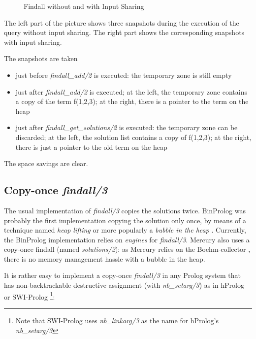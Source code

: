 \documentclass{tlp}
\begin{document}
\begin{figure}[h]
\begin{centering}
{}
\caption{Findall without and with Input Sharing}
\label{findallfig1}
\end{centering}
\end{figure}

The left part of the picture shows three snapshots during the execution
of the query without input sharing. The right part shows the
corresponding snapshots with input sharing.

The snapshots are taken 
\begin{itemize}
\item just before {\em findall\_add/2} is executed: the temporary zone is
  still empty
\item just after {\em findall\_add/2} is executed; at the left, the temporary
zone contains a copy of the term f(1,2,3); at the right, there is a
pointer to the term on the heap
\item just after {\em findall\_get\_solutions/2} is executed: the temporary
  zone can be discarded; at the left, the solution list contains a
copy of f(1,2,3); at the right, there is just a pointer to the old
term on the heap
\end{itemize}

The space savings are clear.


\subsection{Copy-once {\em findall/3}}

The usual implementation of {\em findall/3} copies the solutions twice.
BinProlog was probably the first implementation copying the solution
only once, by means of a technique named {\em heap lifting} or more
popularly a {\em bubble in the heap}
\cite{ecologicalPaul@IWMM-92}. Currently, the BinProlog
implementation \cite{padl09inter} relies on {\em engines} for
{\em findall/3}. Mercury also uses a copy-once findall (named {\em solutions/2}):
as Mercury relies on the Boehm-collector \cite{hansboehm}, there is no memory
management hassle with a bubble in the heap.

It is rather easy to implement a copy-once {\em findall/3} in any
Prolog system that has non-backtrackable destructive assignment (with
{\em nb\_setarg/3}) as in hProlog or SWI-Prolog
\cite{swiprolog}\footnote{Note that SWI-Prolog uses {\em nb\_linkarg/3}
  as the name for hProlog's {\em nb\_setarg/3}}:
\end{document}
